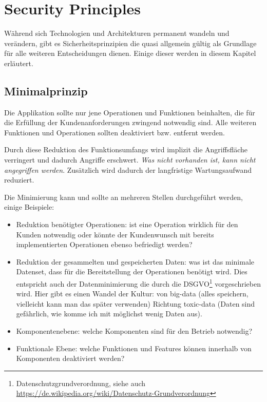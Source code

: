 \chapter{Security Principles}

Während sich Technologien und Architekturen permanent wandeln und verändern, gibt es Sicherheitsprinzipien die quasi allgemein gültig als Grundlage für alle weiteren Entscheidungen dienen. Einige dieser werden in diesem Kapitel erläutert.

\section{Minimalprinzip}

Die Applikation sollte nur jene Operationen und Funktionen beinhalten, die für die Erfüllung der Kundenanforderungen zwingend notwendig sind. Alle weiteren Funktionen und Operationen sollten deaktiviert bzw. entfernt werden.

Durch diese Reduktion des Funktionsumfangs wird implizit die Angriffsfläche verringert und dadurch Angriffe erschwert. \textit{Was nicht vorhanden ist, kann nicht angegriffen werden}. Zusätzlich wird dadurch der langfristige Wartungsaufwand reduziert.

Die Minimierung kann und sollte an mehreren Stellen durchgeführt werden, einige Beispiele:

\begin{itemize}
	\item Reduktion benötigter Operationen: ist eine Operation wirklich für den Kunden notwendig oder könnte der Kundenwunsch mit bereits implementierten Operationen ebenso befriedigt werden?
	\item Reduktion der gesammelten und gespeicherten Daten: was ist das minimale Datenset, dass für die Bereitstellung der Operationen benötigt wird. Dies entspricht auch der Datenminimierung die durch die DSGVO\footnote{Datenschutzgrundverordnung, siehe auch \url{https://de.wikipedia.org/wiki/Datenschutz-Grundverordnung}} vorgeschrieben wird. Hier gibt es einen Wandel der Kultur: von big-data (alles speichern, vielleicht kann man das später verwenden) Richtung toxic-data (Daten sind gefährlich, wie komme ich mit möglichst wenig Daten aus).
	\item Komponentenebene: welche Komponenten sind für den Betrieb notwendig?
	\item Funktionale Ebene: welche Funktionen und Features können innerhalb von Komponenten deaktiviert werden?
\end{itemize}

